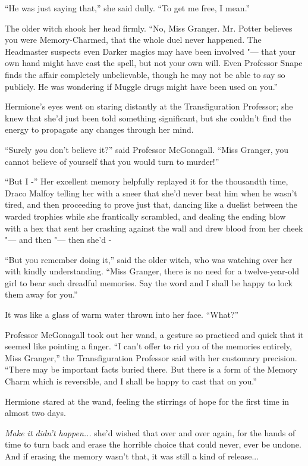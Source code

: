 ``He was just saying that,'' she said dully. ``To get me free, I mean.''

The older witch shook her head firmly. ``No, Miss Granger. Mr. Potter
believes you were Memory-Charmed, that the whole duel never happened.
The Headmaster suspects even Darker magics may have been involved "--- that
your own hand might have cast the spell, but not your own will. Even
Professor Snape finds the affair completely unbelievable, though he may
not be able to say so publicly. He was wondering if Muggle drugs might
have been used on you.''

Hermione's eyes went on staring distantly at the Transfiguration
Professor; she knew that she'd just been told something significant, but
she couldn't find the energy to propagate any changes through her mind.

``Surely \emph{you} don't believe it?'' said Professor McGonagall. ``Miss
Granger, you cannot believe of yourself that you would turn to murder!''

``But I -'' Her excellent memory helpfully replayed it for the
thousandth time, Draco Malfoy telling her with a sneer that she'd never
beat him when he wasn't tired, and then proceeding to prove just that,
dancing like a duelist between the warded trophies while she frantically
scrambled, and dealing the ending blow with a hex that sent her crashing
against the wall and drew blood from her cheek "--- and then "--- then she'd -

``But you remember doing it,'' said the older witch, who was watching
over her with kindly understanding. ``Miss Granger, there is no need for
a twelve-year-old girl to bear such dreadful memories. Say the word and
I shall be happy to lock them away for you.''

It was like a glass of warm water thrown into her face. ``What?''

Professor McGonagall took out her wand, a gesture so practiced and quick
that it seemed like pointing a finger. ``I can't offer to rid you of the
memories entirely, Miss Granger,'' the Transfiguration Professor said
with her customary precision. ``There may be important facts buried
there. But there is a form of the Memory Charm which is reversible, and
I shall be happy to cast that on you.''

Hermione stared at the wand, feeling the stirrings of hope for the first
time in almost two days.

\emph{Make it didn't happen...} she'd wished that over and over
again, for the hands of time to turn back and erase the horrible choice
that could never, ever be undone. And if erasing the memory wasn't that,
it was still a kind of release...

